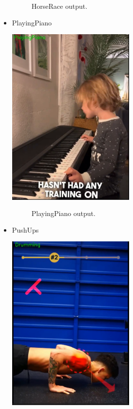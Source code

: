 \begin{itemize}
\begin{figure}[h!]
    	\caption[HorseRace output .]{HorseRace output.}
    	\label{race_conv.png} 
        \end{figure}

    \item PlayingPiano

        \includegraphics[width=0.5\textwidth]{Figures/piano_conv.png}
        \begin{figure}[h!]
    	\centering
    	
    	\caption[PlayingPiano output .]{PlayingPiano output.}
    	\label{piano_conv.png} 
        \end{figure}

    \item PushUps

        \includegraphics[width=0.5\textwidth]{Figures/pushup_conv.png}
        \begin{figure}[h!]
    	\centering
    	

\end{figure}
\end{itemize}
